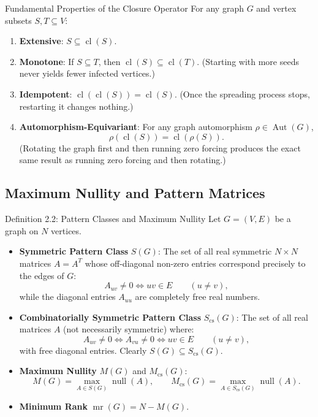 \documentclass[11pt]{article}
\begin{document}
\begin{defbox}{Fundamental Properties of the Closure Operator}
For any graph $G$ and vertex subsets $S, T \subseteq V$:
\begin{enumerate}[leftmargin=*,nosep]
  \item \textbf{Extensive}: $S \subseteq \operatorname{cl}(S)$.
  \item \textbf{Monotone}: If $S \subseteq T$, then $\operatorname{cl}(S) \subseteq \operatorname{cl}(T)$. (Starting with more seeds never yields fewer infected vertices.)
  \item \textbf{Idempotent}: $\operatorname{cl}(\operatorname{cl}(S)) = \operatorname{cl}(S)$. (Once the spreading process stops, restarting it changes nothing.)
  \item \textbf{Automorphism-Equivariant}: For any graph automorphism $\rho \in \operatorname{Aut}(G)$,
  \begin{equation}
    \rho(\operatorname{cl}(S)) = \operatorname{cl}(\rho(S)).
  \end{equation}
  (Rotating the graph first and then running zero forcing produces the exact same result as running zero forcing and then rotating.)
\end{enumerate}
\end{defbox}

\subsection{Maximum Nullity and Pattern Matrices}

\begin{defbox}{Definition 2.2: Pattern Classes and Maximum Nullity}
Let $G = (V, E)$ be a graph on $N$ vertices.
\begin{itemize}[leftmargin=*,nosep]
  \item \textbf{Symmetric Pattern Class} $S(G)$: The set of all real symmetric $N \times N$ matrices $A = A^T$ whose off-diagonal non-zero entries correspond precisely to the edges of $G$:
  \begin{equation}
    A_{uv} \ne 0 \iff uv \in E \qquad (u \ne v),
  \end{equation}
  while the diagonal entries $A_{uu}$ are completely free real numbers.
  \item \textbf{Combinatorially Symmetric Pattern Class} $S_{\mathrm{cs}}(G)$: The set of all real matrices $A$ (not necessarily symmetric) where:
  \begin{equation}
    A_{uv} \ne 0 \iff A_{vu} \ne 0 \iff uv \in E \qquad (u \ne v),
  \end{equation}
  with free diagonal entries. Clearly $S(G) \subseteq S_{\mathrm{cs}}(G)$.
  \item \textbf{Maximum Nullity} $M(G)$ and $M_{\mathrm{cs}}(G)$:
  \begin{equation}
    M(G) = \max_{A \in S(G)} \operatorname{null}(A), \qquad M_{\mathrm{cs}}(G) = \max_{A \in S_{\mathrm{cs}}(G)} \operatorname{null}(A).
  \end{equation}
  \item \textbf{Minimum Rank} $\operatorname{mr}(G) = N - M(G)$.
\end{itemize}
\end{defbox}
\end{document}
